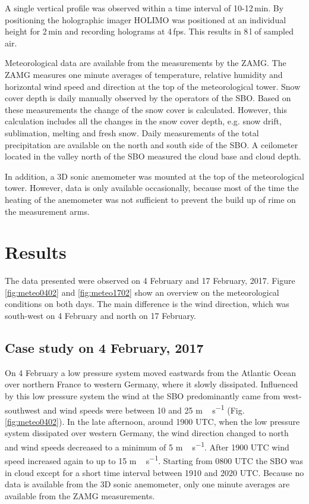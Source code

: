 \documentclass[draft,linenumbers]{agujournal}
\begin{document}
A single vertical profile was observed within a time interval of 10-12\,\si{min}. By positioning the holographic imager HOLIMO was positioned at an individual height for 2\,\si{min} and recording holograms at 4\,\si{fps}. This results in 8\,\si{l} of sampled air. 
 

Meteorological data are available from the measurements by the ZAMG. The ZAMG measures one minute averages of temperature, relative humidity and horizontal wind speed and direction at the top of the meteorological tower. Snow cover depth is daily manually observed by the operators of the SBO. Based on these measurements the change of the snow cover is calculated. However, this calculation includes all the changes in the snow cover depth, e.g. snow drift, sublimation, melting and fresh snow. Daily measurements of the total precipitation are available on the north and south side of the SBO. A ceilometer located in the valley north of the SBO measured the cloud base and cloud depth. 

In addition, a 3D sonic anemometer was mounted at the top of the meteorological tower. However, data is only available occasionally, because most of the time the heating of the anemometer was not sufficient to prevent the build up of rime on the measurement arms. 

\section{Results}
\label{Results}

The data presented were observed on 4 February and 17 February, 2017. Figure \ref{fig:meteo0402} and \ref{fig:meteo1702} show an overview on the meteorological conditions on both days. The main difference is the wind direction, which was south-west on 4 February and north on 17 February. 

\subsection{Case study on 4 February, 2017}

On 4 February a low pressure system moved eastwards from the Atlantic Ocean over northern France to western Germany, where it slowly dissipated. Influenced by this low pressure system the wind at the SBO predominantly came from west-southwest and wind speeds were between 10 and 25 \si{m\,s^{-1}} (Fig. \ref{fig:meteo0402}). In the late afternoon, around 1900 UTC, when the low pressure system dissipated over western Germany, the wind direction changed to north and wind speeds decreased to a minimum of 5 \si{m\,s^{-1}}. After 1900 UTC wind speed increased again to up to 15 \si{m\,s^{-1}}. Starting from 0800 UTC the SBO was in cloud except for a short time interval between 1910 and 2020 UTC. Because no data is available from the 3D sonic anemometer, only one minute averages are available from the ZAMG measurements. 
\end{document}
